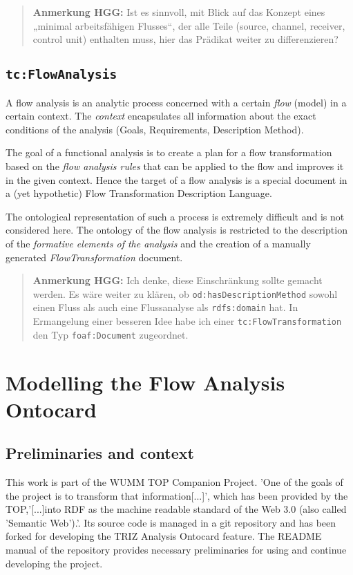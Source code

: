 \documentclass[a4paper,11pt]{article}
\newcommand{\HGG}[1]{\begin{quote}\textbf{Anmerkung HGG:} #1\end{quote}}
\begin{document}
    \HGG{Ist es sinnvoll, mit Blick auf das Konzept eines „minimal arbeitsfähigen
    Flusses“, der alle Teile (source, channel, receiver, control unit) enthalten
    muss, hier das Prädikat weiter zu differenzieren?}

    \subsection{\texttt{tc:FlowAnalysis}}

    A flow analysis is an analytic process concerned with a certain \emph{flow}
    (model) in a certain context.  The \emph{context} encapsulates all information
    about the exact conditions of the analysis (Goals, Requirements, Description
    Method).

    The goal of a functional analysis is to create a plan for a flow
    transformation based on the \emph{flow analysis rules} that can be applied to
    the flow and improves it in the given context. Hence the target of a flow
    analysis is a special document in a (yet hypothetic) Flow Transformation
    Description Language.

    The ontological representation of such a process is extremely difficult and is
    not considered here. The ontology of the flow analysis is restricted to the
    description of the \emph{formative elements of the analysis} and the creation
    of a manually generated \emph{FlowTransformation} document.

    \HGG{Ich denke, diese Einschränkung sollte gemacht werden. Es wäre weiter zu
    klären, ob \texttt{od:hasDescriptionMethod} sowohl einen Fluss als auch eine
    Flussanalyse als \texttt{rdfs:domain} hat. In Ermangelung einer besseren Idee
    habe ich einer \texttt{tc:FlowTransformation} den Typ \texttt{foaf:Document}
    zugeordnet. }

    \section{Modelling the Flow Analysis Ontocard}
    \subsection{Preliminaries and context}
    This work is part of the WUMM\cite{WUMM} TOP Companion Project\cite{WUMMTOP}. 'One of the goals of the project is to transform that information[...]',
    which has been provided by the TOP,'[...]into RDF as the machine readable standard of the Web 3.0 (also called 'Semantic Web').'\cite{WUMMTOP}. Its 
    source code is managed in a git repository\cite{RDFData} and has been forked for developing the TRIZ Analysis Ontocard feature. The README manual
    of the repository provides necessary preliminaries for using and continue developing the project.
    
\end{document}
